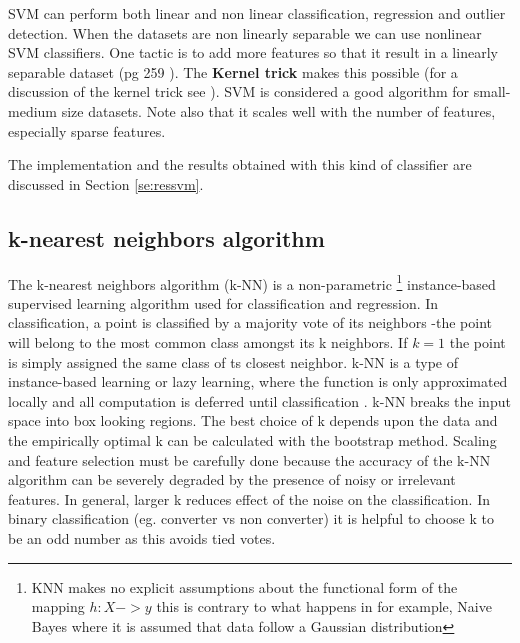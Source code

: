 \documentclass[11pt]{article}
\theoremstyle{definition}
\theoremstyle{remark}
\begin{document}

SVM can perform both linear and non linear classification, regression and outlier detection. When the datasets are non linearly separable we can use nonlinear SVM classifiers. One tactic is to add more features so that it result in a linearly separable dataset (pg 259 \cite{geron2017hands}). The \textbf{Kernel trick} makes this possible (for a discussion of the kernel trick see \cite{vapnik2013nature}). SVM is considered a good algorithm for small-medium size datasets. Note also that it scales well with the number of features, especially sparse features. 

The implementation and the results obtained with this kind of classifier are discussed in Section \ref{se:ressvm}.

\subsection{k-nearest neighbors algorithm}
\label{sse:kneighbors}

The k-nearest neighbors algorithm (k-NN) is a non-parametric \footnote{KNN makes no explicit assumptions about the functional form of the mapping $h:X->y$ this is contrary to what happens in for example, Naive Bayes where it is assumed that data follow a Gaussian distribution} instance-based supervised learning algorithm used for classification and regression. In classification, a point is classified by a majority vote of its neighbors -the point will belong to the most common class amongst its k neighbors. If $k=1$ the point is simply assigned the same class of ts closest neighbor.
k-NN is a type of instance-based learning or lazy learning, where the function is only approximated locally and all computation is deferred until classification \cite{keller1985fuzzy}. k-NN breaks the input space into box looking regions. The best choice of k depends upon the data and the empirically optimal k can be calculated with the bootstrap method. Scaling and feature selection must be carefully done because the accuracy of the k-NN algorithm can be severely degraded by the presence of noisy or irrelevant features. In general, larger k reduces effect of the noise on the classification. In binary classification (eg. converter vs non converter) it is helpful to choose k to be an odd number as this avoids tied votes.
\end{document}
